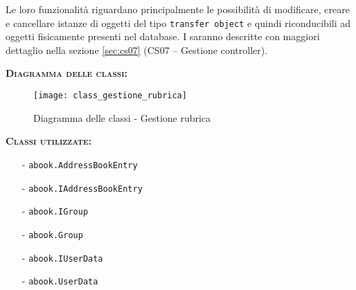 \begin{description}
Le loro funzionalità riguardano principalmente le possibilità di modificare, creare e cancellare istanze di oggetti del tipo \texttt{transfer object} e quindi riconducibili ad oggetti fisicamente presenti nel database. I  saranno descritte con maggiori dettaglio nella sezione \vref{sec:cs07} (\textsf{CS07 -- Gestione controller}).

	\item{\scshape\bfseries Diagramma delle classi:}
\begin{figure}[H]
  \centering
  \texttt{[image: class\_gestione\_rubrica]}
  \caption{Diagramma delle classi - Gestione rubrica}\label{fig:gestionerubrica}
\end{figure}
	
	\item{\scshape\bfseries Classi utilizzate:}\\
	\begin{itemize}[nolistsep, noitemsep]
	  \item[-] \texttt{abook.AddressBookEntry}
	  \item[-] \texttt{abook.IAddressBookEntry}
	  \item[-] \texttt{abook.IGroup}
	  \item[-] \texttt{abook.Group}
	  \item[-] \texttt{abook.IUserData}
	  \item[-] \texttt{abook.UserData}
	\end{itemize}
\end{description}


